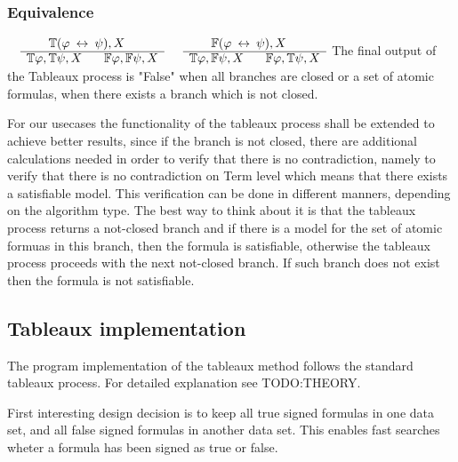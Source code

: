 \documentclass{article}
\begin{document}
		\subsubsection*{Equivalence}
			$\begin{array}{rl}
				& \:\:\:\:\:\:\:\: \mathbb{T}(\varphi \: \leftrightarrow \: \psi), X \\
			      \cline{2-2}
			      & \mathbb{T}\varphi, \mathbb{T}\psi, X \:\:\:\:\:\:\:\: \mathbb{F}\varphi, \mathbb{F}\psi, X
			\end{array}$
			\:\:\:\:\:\:\:\:\:\:
			$\begin{array}{rl}
				& \:\:\:\:\:\:\:\: \mathbb{F}(\varphi \: \leftrightarrow \: \psi), X \\
			      \cline{2-2}
			      & \mathbb{T}\varphi, \mathbb{F}\psi, X \:\:\:\:\:\:\:\: \mathbb{F}\varphi, \mathbb{T}\psi, X
			\end{array}$
		\newline
		\newline
		\newline
		The final output of the Tableaux process is "False" when all branches are closed or a set of atomic formulas, when there exists a branch which is not closed.
		\newline
	
		For our usecases the functionality of the tableaux process shall be extended to achieve better results, since if the branch is not closed, there are 
		additional calculations needed in order to verify that there is no contradiction, namely to verify that there is no contradiction on Term level which means 
		that there exists a satisfiable model.
		This verification can be done in different manners, depending on the algorithm type. The best way to think about it is that the tableaux process returns a 
		not-closed branch and if there is a model for the set of atomic formuas in this branch, then the formula is satisfiable, otherwise the tableaux process proceeds 
		with the next not-closed branch. If such branch does not exist then the formula is not satisfiable. 

	\subsection{Tableaux implementation}
		The program implementation of the tableaux method follows the standard tableaux process. For detailed explanation see TODO:THEORY.

		First interesting design decision is to keep all true signed formulas in one data set, and all false signed formulas in another data set.
		This enables fast searches wheter a formula has been signed as true or false.
		
\end{document}
